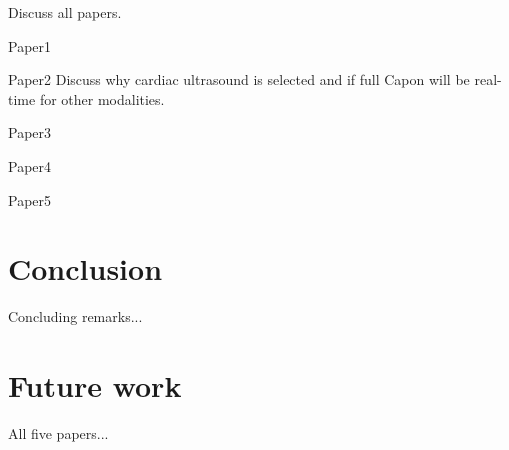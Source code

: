 Discuss all papers.

Paper1

Paper2
Discuss why cardiac ultrasound is selected and if full Capon will be real-time for other modalities.

Paper3

Paper4

Paper5

\section{Conclusion}

Concluding remarks...

\section{Future work}

All five papers...

\endinput